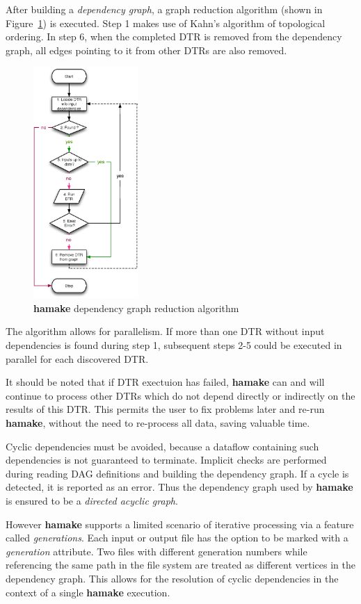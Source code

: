 \documentclass[10pt,conference,letterpaper]{IEEEtran}
\begin{document}
After building a \textit{dependency graph}, a graph reduction algorithm (shown in Figure~\ref{fig:grred}) is
executed. Step 1 makes use of Kahn's algorithm\cite{kahn1962topological} of
topological ordering. In step 6, when the completed DTR is
removed from the dependency graph, all edges pointing to it from other
DTRs are also removed.

\begin{figure}[htp]
\centering
\includegraphics[width=4cm]{GraphReduction.eps}
\caption{\textbf{hamake} dependency graph reduction algorithm}
\label{fig:grred}
\end{figure}

The algorithm allows for parallelism. If more than one DTR without
input dependencies is found during step 1, subsequent steps 2-5 could
be executed in parallel for each discovered DTR.

It should be noted that if DTR exectuion has failed, \textbf{hamake} can
and will continue to process other DTRs which do not depend directly or indirectly
on the results of this DTR. This permits the user to fix problems later and
re-run \textbf{hamake}, without the need to re-process all data, saving valuable time.

Cyclic dependencies must be avoided, because a dataflow containing
such dependencies is not guaranteed to terminate. Implicit checks are
performed during reading DAG definitions and building the dependency
graph. If a cycle is detected, it is reported as an error. Thus the
dependency graph used by \textbf{hamake} is ensured to be a
\textit{directed acyclic graph}.

However \textbf{hamake} supports a limited scenario of iterative
processing via a feature called \textit{generations}. Each input or
output file has the option to be marked with a \emph{generation}
attribute. Two files with different generation numbers while
referencing the same path in the file system are treated as different
vertices in the dependency graph. This allows for the resolution of cyclic dependencies
in the context of a single \textbf{hamake} execution.
\end{document}
